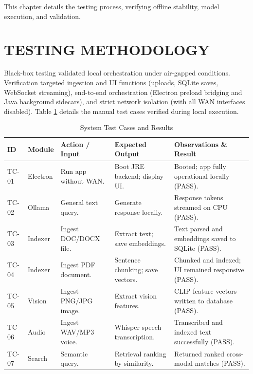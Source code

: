 \documentclass[12pt,a4paper]{report}
\begin{document}
This chapter details the testing process, verifying offline stability, model execution, and validation.

\section{TESTING METHODOLOGY}
Black-box testing validated local orchestration under air-gapped conditions. Verification targeted ingestion and UI functions (uploads, SQLite saves, WebSocket streaming), end-to-end orchestration (Electron preload bridging and Java background sidecars), and strict network isolation (with all WAN interfaces disabled). Table \ref{tab:test_cases} details the manual test cases verified during local execution.

\begin{table}[!ht]
\centering
\scriptsize
\begin{tabularx}{\textwidth}{|>{\hsize=0.35\hsize}X|>{\hsize=0.7\hsize}X|>{\hsize=1.2\hsize}X|>{\hsize=1.3\hsize}X|>{\hsize=1.45\hsize}X|}
\hline
\textbf{ID} & \textbf{Module} & \textbf{Action / Input} & \textbf{Expected Output} & \textbf{Observations \& Result} \\ \hline
TC-01 & Electron & Run app without WAN. & Boot JRE backend; display UI. & Booted; app fully operational locally (PASS). \\ \hline
TC-02 & Ollama & General text query. & Generate response locally. & Response tokens streamed on CPU (PASS). \\ \hline
TC-03 & Indexer & Ingest DOC/DOCX file. & Extract text; save embeddings. & Text parsed and embeddings saved to SQLite (PASS). \\ \hline
TC-04 & Indexer & Ingest PDF document. & Sentence chunking; save vectors. & Chunked and indexed; UI remained responsive (PASS). \\ \hline
TC-05 & Vision & Ingest PNG/JPG image. & Extract vision features. & CLIP feature vectors written to database (PASS). \\ \hline
TC-06 & Audio & Ingest WAV/MP3 voice. & Whisper speech transcription. & Transcribed and indexed text successfully (PASS). \\ \hline
TC-07 & Search & Semantic query. & Retrieval ranking by similarity. & Returned ranked cross-modal matches (PASS). \\ \hline
\end{tabularx}
\caption{System Test Cases and Results}
\label{tab:test_cases}
\end{table}
\end{document}

